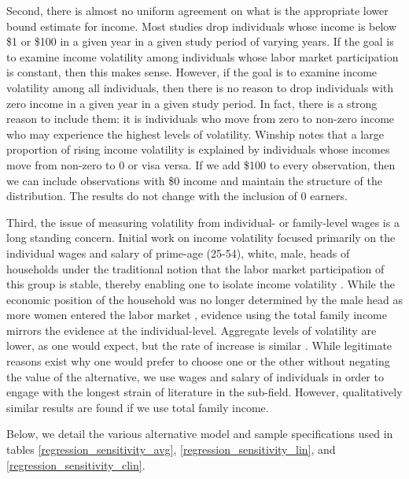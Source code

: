 \documentclass[12pt]{article}
\begin{document}
Second, there is almost no uniform agreement on what is the appropriate lower bound estimate for income. Most studies drop individuals whose income is below \$1 or \$100 in a given year in a given study period of varying years. If the goal is to examine income volatility among individuals whose labor market participation is constant, then this makes sense. However, if the goal is to examine income volatility among all individuals, then there is no reason to drop individuals with zero income in a given year in a given study period. In fact, there is a strong reason to include them: it is individuals who move from zero to non-zero income who may experience the highest levels of volatility. Winship \citeyearpar{winship_2011} notes that a large proportion of rising income volatility is explained by individuals whose incomes move from non-zero to 0 or visa versa. If we add \$100 to every observation, then we can include observations with \$0 income and maintain the structure of the distribution.  The results do not change with the inclusion of 0 earners.

Third, the issue of measuring volatility from individual- or family-level wages is a long standing concern. Initial work on income volatility focused primarily on the individual wages and salary of prime-age (25-54), white, male, heads of households under the traditional notion that the labor market participation of this group is stable, thereby enabling one to isolate income volatility \citep{gottschalk_danziger_1998}. While the economic position of the household was no longer determined by the male head as more women entered the labor market \citep{diprete_mcmanus_2000}, evidence using the total family income mirrors the evidence at the individual-level. Aggregate levels of volatility are lower, as one would expect, but the rate of increase is similar \citep{gittleman_joyce_1999,dynan_etal_2012}. While legitimate reasons exist why one would prefer to choose one or the other without negating the value of the alternative, we use wages and salary of individuals in order to engage with the longest strain of literature in the sub-field. However, qualitatively similar results are found if we use total family income.

Below, we detail the various alternative model and sample specifications used in tables \ref{regression_sensitivity_avg}, \ref{regression_sensitivity_lin}, and \ref{regression_sensitivity_clin}.
\end{document}
